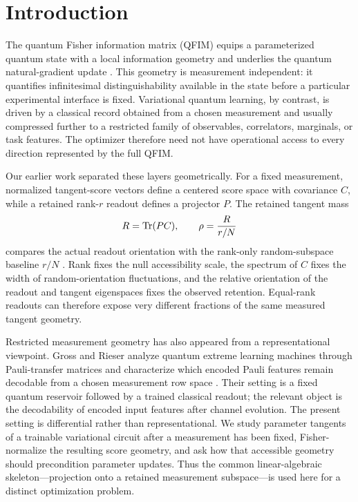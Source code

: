 \section{Introduction}
The quantum Fisher information matrix (QFIM) equips a parameterized quantum state with a local information geometry and underlies the quantum natural-gradient update \cite{Braunstein1994,Stokes2020}. This geometry is measurement independent: it quantifies infinitesimal distinguishability available in the state before a particular experimental interface is fixed. Variational quantum learning, by contrast, is driven by a classical record obtained from a chosen measurement and usually compressed further to a restricted family of observables, correlators, marginals, or task features. The optimizer therefore need not have operational access to every direction represented by the full QFIM.

Our earlier work separated these layers geometrically. For a fixed measurement, normalized tangent-score vectors define a centered score space with covariance $C$, while a retained rank-$r$ readout defines a projector $P$. The retained tangent mass
\begin{equation}
 R=\operatorname{Tr}(PC),\qquad \rho=\frac{R}{r/N}
 \label{eq:retention_intro}
\end{equation}
compares the actual readout orientation with the rank-only random-subspace baseline $r/N$ \cite{AitHaddouSpectral}. Rank fixes the null accessibility scale, the spectrum of $C$ fixes the width of random-orientation fluctuations, and the relative orientation of the readout and tangent eigenspaces fixes the observed retention. Equal-rank readouts can therefore expose very different fractions of the same measured tangent geometry.

Restricted measurement geometry has also appeared from a representational viewpoint. Gross and Rieser analyze quantum extreme learning machines through Pauli-transfer matrices and characterize which encoded Pauli features remain decodable from a chosen measurement row space \cite{GrossRieser2026}. Their setting is a fixed quantum reservoir followed by a trained classical readout; the relevant object is the decodability of encoded input features after channel evolution. The present setting is differential rather than representational. We study parameter tangents of a trainable variational circuit after a measurement has been fixed, Fisher-normalize the resulting score geometry, and ask how that accessible geometry should precondition parameter updates. Thus the common linear-algebraic skeleton---projection onto a retained measurement subspace---is used here for a distinct optimization problem.


